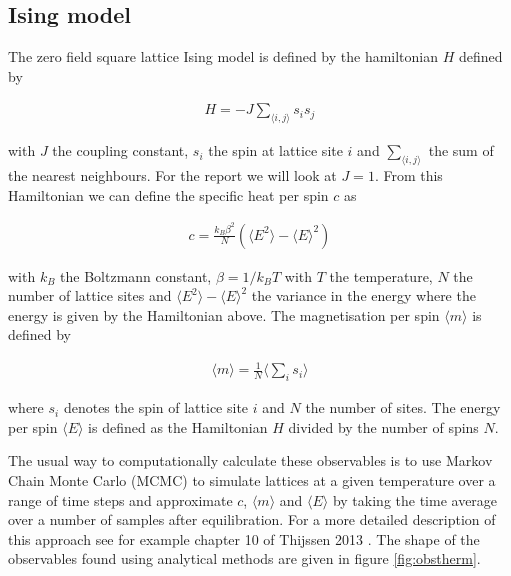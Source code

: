 \documentclass[10 pt, a4paper]{article}
\begin{document}
\subsection{Ising model} \label{sec:ising}

The zero field square lattice Ising model is defined by the hamiltonian $H$ defined by

\begin{align}
H = - J \sum_{\langle i,j\rangle} s_i s_j 
\end{align}

with $J$ the coupling constant, $s_i$ the spin at lattice site $i$ and $\sum_{\langle i,j\rangle}$ the sum of the nearest neighbours. For the report we will look at $J = 1$. From this Hamiltonian we can define the specific heat per spin $c$ as

\begin{align}
c = \frac{k_B \beta^2}{N} \left( \langle E^2 \rangle - \langle E \rangle^2 \right)
\end{align}

with $k_B$ the Boltzmann constant, $\beta = 1/k_B T$ with $T$ the temperature, $N$ the number of lattice sites and $\langle E^2 \rangle - \langle E \rangle^2$ the variance in the energy where the energy is given by the Hamiltonian above. The magnetisation per spin $\langle m\rangle$ is defined by

\begin{align}
\langle m\rangle = \frac{1}{N} \langle \sum_i s_i\rangle
\end{align}

where $s_i$ denotes the spin of lattice site $i$ and $N$ the number of sites. The energy per spin $\langle E\rangle$ is defined as the Hamiltonian $H$ divided by the number of spins $N$. 

\newpage

The usual way to computationally calculate these observables is to use Markov Chain Monte Carlo (MCMC) to simulate lattices at a given temperature over a range of time steps and approximate $c$, $\langle m\rangle$ and $\langle E\rangle$ by taking the time average over a number of samples after equilibration. For a more detailed description of this approach see for example chapter 10 of Thijssen 2013 \cite{thijssen}. The shape of the observables found using analytical methods are given in figure \ref{fig:obstherm}.
\end{document}
